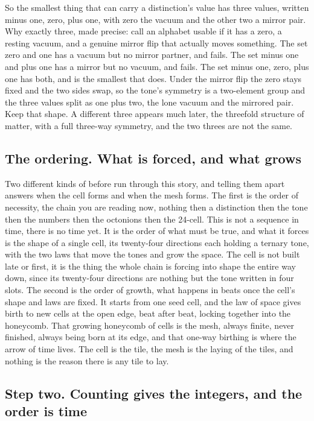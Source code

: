 So the smallest thing that can carry a distinction's value has three values, written minus one, zero, plus one, with zero the vacuum and the other two a mirror pair. Why exactly three, made precise: call an alphabet usable if it has a zero, a resting vacuum, and a genuine mirror flip that actually moves something. The set zero and one has a vacuum but no mirror partner, and fails. The set minus one and plus one has a mirror but no vacuum, and fails. The set minus one, zero, plus one has both, and is the smallest that does. Under the mirror flip the zero stays fixed and the two sides swap, so the tone's symmetry is a two-element group and the three values split as one plus two, the lone vacuum and the mirrored pair. Keep that shape. A different three appears much later, the threefold structure of matter, with a full three-way symmetry, and the two threes are not the same.

\subsection*{The ordering. What is forced, and what grows}

Two different kinds of before run through this story, and telling them apart answers when the cell forms and when the mesh forms. The first is the order of necessity, the chain you are reading now, nothing then a distinction then the tone then the numbers then the octonions then the 24-cell. This is not a sequence in time, there is no time yet. It is the order of what must be true, and what it forces is the shape of a single cell, its twenty-four directions each holding a ternary tone, with the two laws that move the tones and grow the space. The cell is not built late or first, it is the thing the whole chain is forcing into shape the entire way down, since its twenty-four directions are nothing but the tone written in four slots. The second is the order of growth, what happens in beats once the cell's shape and laws are fixed. It starts from one seed cell, and the law of space gives birth to new cells at the open edge, beat after beat, locking together into the honeycomb. That growing honeycomb of cells is the mesh, always finite, never finished, always being born at its edge, and that one-way birthing is where the arrow of time lives. The cell is the tile, the mesh is the laying of the tiles, and nothing is the reason there is any tile to lay.

\subsection*{Step two. Counting gives the integers, and the order is time}

